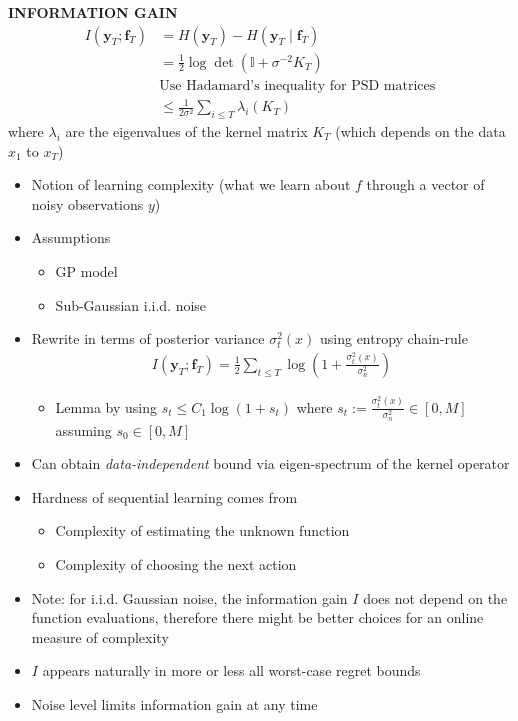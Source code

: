 \begin{whitebox}{\textbf{INFORMATION GAIN}}
    \begin{align*}
        I(\bm{y}_T;\bm{f}_T)&=H(\bm{y}_T)-H(\bm{y}_T\mid \bm{f}_T)\\
        &=\frac{1}{2}\log\det(\mathbb{I}+\sigma^{-2}K_T)\\
        &\text{Use Hadamard's inequality for PSD matrices}\\
        &\leq\frac{1}{2\sigma^2}\sum_{i\leq T}\lambda_i(K_T)
    \end{align*}
    where $\lambda_i$ are the eigenvalues of the kernel matrix $K_T$ (which depends on the data $x_1$ to $x_T$)
    \begin{itemize}
        \item Notion of learning complexity (what we learn about $f$ through a vector of noisy observations $y$)
        \item Assumptions
        \begin{itemize}
            \item GP model
            \item Sub-Gaussian i.i.d. noise
        \end{itemize}
        \item Rewrite in terms of posterior variance $\sigma_t^2(x)$ using entropy chain-rule
        \begin{align*}
            I(\bm{y}_T;\bm{f}_T)=\frac{1}{2}\sum_{t\leq T}\log\left(1+\frac{\sigma_t^2(x)}{\sigma_n^2}\right)
        \end{align*}
        \begin{itemize}
            \item Lemma
            by using $s_t\leq C_1\log(1+s_t)$ where $s_t:=\frac{\sigma_t^2(x)}{\sigma_n^2}\in[0,M]$ assuming $s_0\in[0,M]$
        \end{itemize}
        \item Can obtain \textit{data-independent} bound via eigen-spectrum of the kernel operator
        \item Hardness of sequential learning comes from
        \begin{itemize}
            \item Complexity of estimating the unknown function
            \item Complexity of choosing the next action
        \end{itemize}
        \item Note: for i.i.d. Gaussian noise, the information gain $I$ does not depend on the function evaluations, therefore there might be better choices for an online measure of complexity
        \item $I$ appears naturally in more or less all worst-case regret bounds
        \item Noise level limits information gain at any time
    \end{itemize}
\end{whitebox}

